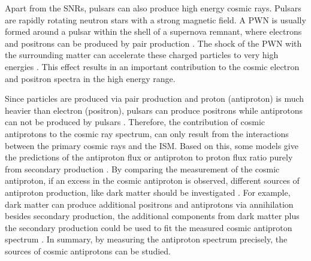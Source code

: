 Apart from the SNRs, pulsars can also produce high energy cosmic rays. Pulsars are rapidly rotating neutron stars with a strong magnetic field. A PWN is usually formed around a pulsar within the shell of a supernova remnant, where electrons and positrons can be produced by pair production \cite{PulsarGenerateCosmicRays, PulsarGenerateCosmicRays2}. The shock of the PWN with the surrounding matter can accelerate these charged particles to very high energies \cite{PulsarPWN, PulsarAccelerateCosmicRays}. This effect results in an important contribution to the cosmic electron and positron spectra in the high energy range. \par

Since particles are produced via pair production and proton (antiproton) is much heavier than electron (positron), pulsars can produce positrons while antiprotons can not be produced by pulsars \cite{PulsarProducePositronOnly, PulsarProducePositronOnly2}. Therefore, the contribution of cosmic antiprotons to the cosmic ray spectrum, can only result from the interactions between the primary cosmic rays and the ISM. Based on this, some models give the predictions of the antiproton flux or antiproton to proton flux ratio purely from secondary production \cite{TimeAveragedPbarRatioPaperSecondaryProduction1, TimeAveragedPbarRatioPaperSecondaryProduction2}. By comparing the measurement of the cosmic antiproton, if an excess in the cosmic antiproton is observed, different sources of antiproton production, like dark matter should be investigated \cite{CosmicAntiprotons, CosmicAntiprotons2,CosmicAntiprotons3}. For example, dark matter can produce additional positrons and antiprotons via annihilation besides secondary production, the additional components from dark matter plus the secondary production could be used to fit the measured cosmic antiproton spectrum \cite{AntiprotonFromSecondaryAndDarkMatterModel}. In summary, by measuring the antiproton spectrum precisely, the sources of cosmic antiprotons can be studied.  
     
     
     
     
     
     